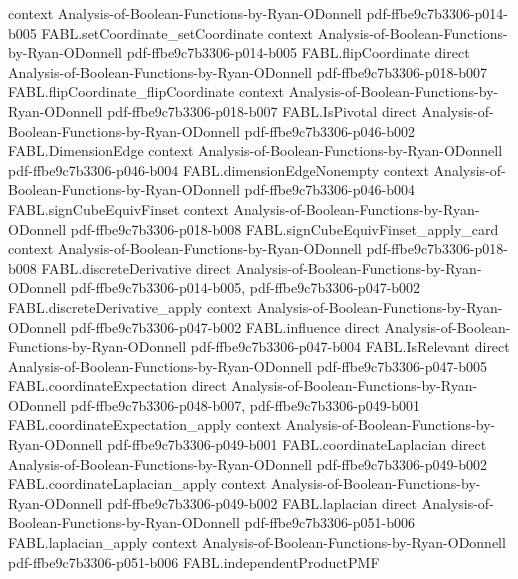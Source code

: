 \begin{theorem}
  {context}
  {Analysis-of-Boolean-Functions-by-Ryan-ODonnell}
  {pdf-ffbe9c7b3306-p014-b005}
\proofstep
  {FABL.setCoordinate_setCoordinate}
  {context}
  {Analysis-of-Boolean-Functions-by-Ryan-ODonnell}
  {pdf-ffbe9c7b3306-p014-b005}
\proofstep
  {FABL.flipCoordinate}
  {direct}
  {Analysis-of-Boolean-Functions-by-Ryan-ODonnell}
  {pdf-ffbe9c7b3306-p018-b007}
\proofstep
  {FABL.flipCoordinate_flipCoordinate}
  {context}
  {Analysis-of-Boolean-Functions-by-Ryan-ODonnell}
  {pdf-ffbe9c7b3306-p018-b007}
\proofstep
  {FABL.IsPivotal}
  {direct}
  {Analysis-of-Boolean-Functions-by-Ryan-ODonnell}
  {pdf-ffbe9c7b3306-p046-b002}
\proofstep
  {FABL.DimensionEdge}
  {context}
  {Analysis-of-Boolean-Functions-by-Ryan-ODonnell}
  {pdf-ffbe9c7b3306-p046-b004}
\proofstep
  {FABL.dimensionEdgeNonempty}
  {context}
  {Analysis-of-Boolean-Functions-by-Ryan-ODonnell}
  {pdf-ffbe9c7b3306-p046-b004}
\proofstep
  {FABL.signCubeEquivFinset}
  {context}
  {Analysis-of-Boolean-Functions-by-Ryan-ODonnell}
  {pdf-ffbe9c7b3306-p018-b008}
\proofstep
  {FABL.signCubeEquivFinset_apply_card}
  {context}
  {Analysis-of-Boolean-Functions-by-Ryan-ODonnell}
  {pdf-ffbe9c7b3306-p018-b008}
\proofstep
  {FABL.discreteDerivative}
  {direct}
  {Analysis-of-Boolean-Functions-by-Ryan-ODonnell}
  {pdf-ffbe9c7b3306-p014-b005,
    pdf-ffbe9c7b3306-p047-b002}
\proofstep
  {FABL.discreteDerivative_apply}
  {context}
  {Analysis-of-Boolean-Functions-by-Ryan-ODonnell}
  {pdf-ffbe9c7b3306-p047-b002}
\proofstep
  {FABL.influence}
  {direct}
  {Analysis-of-Boolean-Functions-by-Ryan-ODonnell}
  {pdf-ffbe9c7b3306-p047-b004}
\proofstep
  {FABL.IsRelevant}
  {direct}
  {Analysis-of-Boolean-Functions-by-Ryan-ODonnell}
  {pdf-ffbe9c7b3306-p047-b005}
\proofstep
  {FABL.coordinateExpectation}
  {direct}
  {Analysis-of-Boolean-Functions-by-Ryan-ODonnell}
  {pdf-ffbe9c7b3306-p048-b007,
    pdf-ffbe9c7b3306-p049-b001}
\proofstep
  {FABL.coordinateExpectation_apply}
  {context}
  {Analysis-of-Boolean-Functions-by-Ryan-ODonnell}
  {pdf-ffbe9c7b3306-p049-b001}
\proofstep
  {FABL.coordinateLaplacian}
  {direct}
  {Analysis-of-Boolean-Functions-by-Ryan-ODonnell}
  {pdf-ffbe9c7b3306-p049-b002}
\proofstep
  {FABL.coordinateLaplacian_apply}
  {context}
  {Analysis-of-Boolean-Functions-by-Ryan-ODonnell}
  {pdf-ffbe9c7b3306-p049-b002}
\proofstep
  {FABL.laplacian}
  {direct}
  {Analysis-of-Boolean-Functions-by-Ryan-ODonnell}
  {pdf-ffbe9c7b3306-p051-b006}
\proofstep
  {FABL.laplacian_apply}
  {context}
  {Analysis-of-Boolean-Functions-by-Ryan-ODonnell}
  {pdf-ffbe9c7b3306-p051-b006}
\proofstep
  {FABL.independentProductPMF}

\end{theorem}
